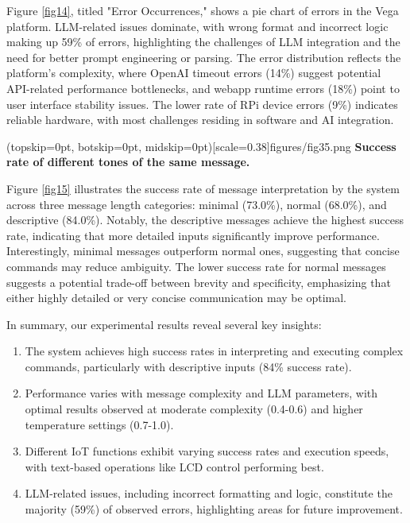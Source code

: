 \documentclass{ieeeaccess}
\begin{document}
Figure \ref{fig14}, titled "Error Occurrences," shows a pie chart of errors in the Vega platform. LLM-related issues dominate, with wrong format and incorrect logic making up 59\% of errors, highlighting the challenges of LLM integration and the need for better prompt engineering or parsing. The error distribution reflects the platform's complexity, where OpenAI timeout errors (14\%) suggest potential API-related performance bottlenecks, and webapp runtime errors (18\%) point to user interface stability issues. The lower rate of RPi device errors (9\%) indicates reliable hardware, with most challenges residing in software and AI integration.

\Figure[t!](topskip=0pt, botskip=0pt,
midskip=0pt)[scale=0.38]{{figures/fig35.png}}
{ \textbf{Success rate of different tones of the same message.}\label{fig15}}

Figure \ref{fig15} illustrates the success rate of message interpretation by the system across three message length categories: minimal (73.0\%), normal (68.0\%), and descriptive (84.0\%). Notably, the descriptive messages achieve the highest success rate, indicating that more detailed inputs significantly improve performance. Interestingly, minimal messages outperform normal ones, suggesting that concise commands may reduce ambiguity. The lower success rate for normal messages suggests a potential trade-off between brevity and specificity, emphasizing that either highly detailed or very concise communication may be optimal. 

In summary, our experimental results reveal several key insights:
\begin{enumerate}
    \item The system achieves high success rates in interpreting and executing complex commands, particularly with descriptive inputs (84\% success rate).
    \item Performance varies with message complexity and LLM parameters, with optimal results observed at moderate complexity (0.4-0.6) and higher temperature settings (0.7-1.0).
    \item Different IoT functions exhibit varying success rates and execution speeds, with text-based operations like LCD control performing best.
    \item LLM-related issues, including incorrect formatting and logic, constitute the majority (59\%) of observed errors, highlighting areas for future improvement.
\end{enumerate}
\end{document}
